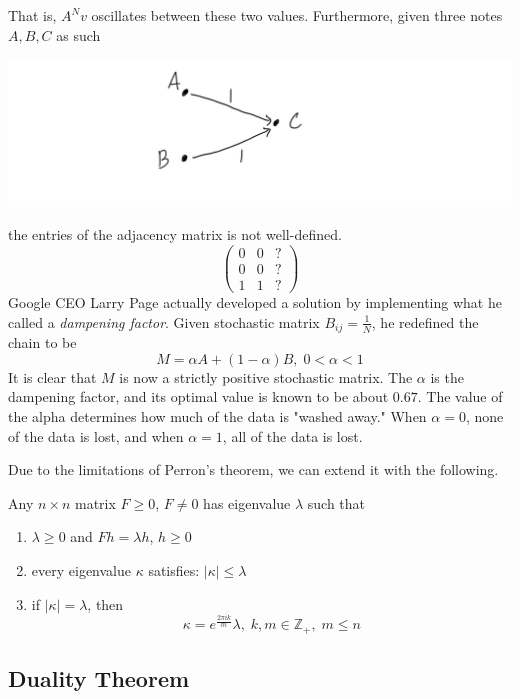 \documentclass{article}
\begin{document}
    That is, $A^N v$ oscillates between these two values. Furthermore, given three notes $A, B, C$ as such
    \begin{center}
        \includegraphics[scale=0.25]{img/Degeneratre_Markov_Chain.PNG} 
    \end{center}
    the entries of the adjacency matrix is not well-defined. 
    \[ \begin{pmatrix} 0&0&? \\0&0&? \\1&1&?\end{pmatrix}\]
    Google CEO Larry Page actually developed a solution by implementing what he called a \textit{dampening factor}. Given stochastic matrix $B_{i j} = \frac{1}{N}$, he redefined the chain to be 
    \[M = \alpha A + (1-\alpha) B, \; 0< \alpha < 1\]
    It is clear that $M$ is now a strictly positive stochastic matrix. The $\alpha$ is the dampening factor, and its optimal value is known to be about $0.67$. The value of the alpha determines how much of the data is "washed away." When $\alpha = 0$, none of the data is lost, and when $\alpha = 1$, all of the data is lost. 

    Due to the limitations of Perron's theorem, we can extend it with the following.

    \begin{theorem}
    Any $n \times n$ matrix $F \geq 0$, $F \neq 0$ has eigenvalue $\lambda$ such that
    \begin{enumerate}
        \item $\lambda \geq 0$ and $F h = \lambda h$, $h\geq 0$ \item every eigenvalue $\kappa$ satisfies: $|\kappa| \leq \lambda$ 
        \item if $|\kappa| = \lambda$, then 
    \[\kappa = e^{\frac{2 \pi i k}{m}} \lambda, \; k, m \in \mathbb{Z}_+, \; m \leq n\]
    \end{enumerate}
    \end{theorem}

  \subsection{Duality Theorem}
\end{document}
